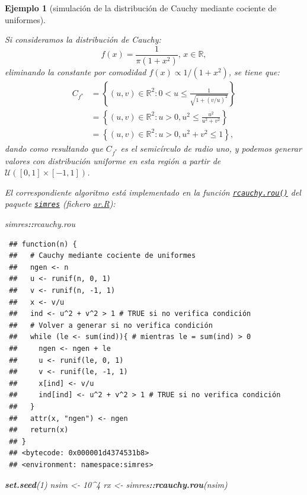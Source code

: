 \documentclass[
  spanish,
  10pt,
]{book}
\newenvironment{Shaded}{\begin{snugshade}}{\end{snugshade}}
\newcommand{\DecValTok}[1]{\textcolor[rgb]{0.00,0.00,0.81}{#1}}
\newcommand{\FunctionTok}[1]{\textcolor[rgb]{0.13,0.29,0.53}{\textbf{#1}}}
\newcommand{\NormalTok}[1]{#1}
\newcommand{\OtherTok}[1]{\textcolor[rgb]{0.56,0.35,0.01}{#1}}
\newcommand{\SpecialCharTok}[1]{\textcolor[rgb]{0.81,0.36,0.00}{\textbf{#1}}}
\theoremstyle{break}
\newtheorem{example}{Ejemplo}[chapter]
\theoremstyle{nonumberplain}
\begin{document}
\begin{example}[simulación de la distribución de Cauchy mediante cociente de uniformes]
\protect\hypertarget{exm:cauchy-rou}{}\label{exm:cauchy-rou}

Si consideramos la distribución de Cauchy:
\[f(x) = \frac{1}{\pi (1 + x^2)} \text{, } x\in \mathbb{R},\]
eliminando la constante por comodidad \(f(x) \propto 1/(1 + x^2)\), se tiene que:
\[\begin{aligned}
C_{f^{\ast}} & = \left\{ (u, v) \in \mathbb{R}^{2} : 0 <u \leq \frac{1}{\sqrt{1 + (v/u)^2}}  \right\} \\
& = \left\{ (u, v) \in \mathbb{R}^{2} : u > 0, u^2 \leq \frac{u^2}{u^2 + v^2}  \right\} \\
& = \left\{ (u, v) \in \mathbb{R}^{2} : u > 0, u^2 + v^2 \leq 1  \right\}, 
\end{aligned}\]
dando como resultando que \(C_{f^{\ast}}\) es el semicírculo de radio uno, y podemos generar valores con distribución uniforme en esta región a partir de \(\mathcal{U}\left([0,1]\times[-1,1] \right)\).

El correspondiente algoritmo está implementado en la función \href{https://rubenfcasal.github.io/simres/reference/rcauchy.rou.html}{\texttt{rcauchy.rou()}} del paquete \href{https://rubenfcasal.github.io/simres}{\texttt{simres}} (fichero \href{R/ar.R}{\emph{ar.R}}):

\begin{Shaded}
\begin{Highlighting}[]
\NormalTok{simres}\SpecialCharTok{::}\NormalTok{rcauchy.rou}
\end{Highlighting}
\end{Shaded}

\begin{verbatim}
 ## function(n) {
 ##   # Cauchy mediante cociente de uniformes
 ##   ngen <- n
 ##   u <- runif(n, 0, 1)
 ##   v <- runif(n, -1, 1)
 ##   x <- v/u
 ##   ind <- u^2 + v^2 > 1 # TRUE si no verifica condición
 ##   # Volver a generar si no verifica condición
 ##   while (le <- sum(ind)){ # mientras le = sum(ind) > 0
 ##     ngen <- ngen + le
 ##     u <- runif(le, 0, 1)
 ##     v <- runif(le, -1, 1)
 ##     x[ind] <- v/u
 ##     ind[ind] <- u^2 + v^2 > 1 # TRUE si no verifica condición
 ##   }
 ##   attr(x, "ngen") <- ngen
 ##   return(x)
 ## }
 ## <bytecode: 0x000001d4374531b8>
 ## <environment: namespace:simres>
\end{verbatim}

\begin{Shaded}
\begin{Highlighting}[]
\FunctionTok{set.seed}\NormalTok{(}\DecValTok{1}\NormalTok{)}
\NormalTok{nsim }\OtherTok{\textless{}{-}} \DecValTok{10}\SpecialCharTok{\^{}}\DecValTok{4}
\NormalTok{rx }\OtherTok{\textless{}{-}}\NormalTok{ simres}\SpecialCharTok{::}\FunctionTok{rcauchy.rou}\NormalTok{(nsim)}


\end{Highlighting}
\end{Shaded}
\end{example}
\end{document}
